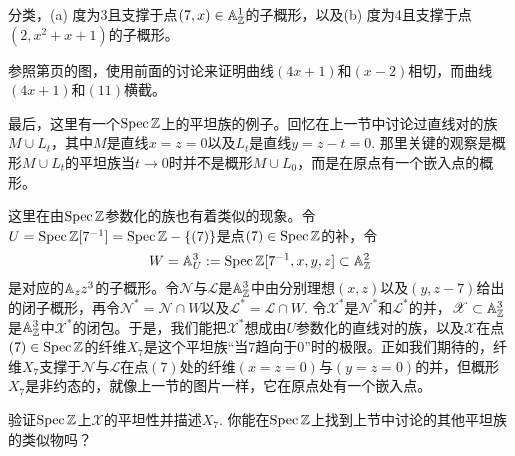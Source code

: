 \begin{exe}
分类，(a) 度为3且支撑于点$(7,x)\in\mathbb{A}_{\mathbb{Z}}^1$的子概形，以及(b) 度为4且支撑于点$(2,x^2+x+1)$的子概形。
\end{exe}

\begin{exe}
参照第\pageref{p.2.18}页的图，使用前面的讨论来证明曲线$(4x + 1)$和$(x-2)$相切，而曲线$(4x + 1)$和$(11)$横截。
\end{exe}

最后，这里有一个$\operatorname{Spec} \mathbb{Z}$上的平坦族的例子。回忆在上一节中讨论过直线对的族$M\cup L_t$，其中$M$是直线$x=z=0$以及$L_t$是直线$y=z-t=0$. 那里关键的观察是概形$M\cup L_t$的平坦族当$t\to 0$时并不是概形$M\cup L_0$，而是在原点有一个嵌入点的概形。

这里在由$\operatorname{Spec} \mathbb{Z}$参数化的族也有着类似的现象。令$U=\operatorname{Spec} \mathbb{Z}[7^{-1}]=\operatorname{Spec} \mathbb{Z}-\{(7)\}$是点$(7)\in\operatorname{Spec}\mathbb{Z}$的补，令
\[
	W=\mathbb{A}_U^3:=\operatorname{Spec} \mathbb{Z}[7^{-1},x,y,z]\subset \mathbb{A}_{\mathbb{Z}}^2
\]
是对应的$\mathbb{A}_zz^3$的子概形。令$\mathscr{N}$与$\mathscr{L}$是$\mathbb{A}_{\mathbb{Z}}^3$中由分别理想$(x,z)$以及$(y,z-7)$给出的闭子概形，再令$\mathscr{N}^*=\mathscr{N}\cap W$以及$\mathscr{L}^*=\mathscr{L}\cap W$. 令$\mathscr{X}^*$是$\mathscr{N}^*$和$\mathscr{L}^*$的并，$\mathscr{X}\subset \mathbb{A}_{\mathbb{Z}}^3$是$\mathbb{A}_{\mathbb{Z}}^3$中$\mathscr{X}^*$的闭包。于是，我们能把$\mathscr{X}^*$想成由$U$参数化的直线对的族，以及$\mathscr{X}$在点$(7)\in\operatorname{Spec} \mathbb{Z}$的纤维$X_7$是这个平坦族“当$7$趋向于$0$”时的极限。正如我们期待的，纤维$X_7$支撑于$\mathscr{N}$与$\mathscr{L}$在点$(7)$处的纤维$(x=z=0)$与$(y=z=0)$的并，但概形$X_7$是非约态的，就像上一节的图片一样，它在原点处有一个嵌入点。

\begin{exe}
验证$\operatorname{Spec}\mathbb{Z}$上$\mathscr{X}$的平坦性并描述$X_7$. 你能在$\operatorname{Spec}\mathbb{Z}$上找到上节中讨论的其他平坦族的类似物吗？
\end{exe}